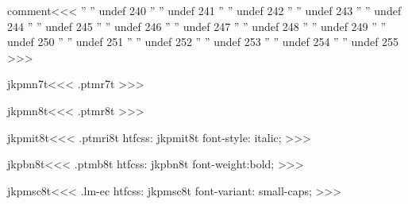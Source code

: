 \<comment\><<<
'' ''   undef    240
'' ''   undef    241
'' ''   undef    242
'' ''   undef    243
'' ''   undef    244
'' ''   undef    245
'' ''   undef    246
'' ''   undef    247
'' ''   undef    248
'' ''   undef    249
'' ''   undef    250
'' ''   undef    251
'' ''   undef    252
'' ''   undef    253
'' ''   undef    254
'' ''   undef    255           
>>>



\<jkpmn7t\><<<
.ptmr7t
>>>

\<jkpmn8t\><<<
.ptmr8t
>>>

\<jkpmit8t\><<<
.ptmri8t
htfcss:  jkpmit8t  font-style: italic;
>>>

\<jkpbn8t\><<<
.ptmb8t
htfcss:  jkpbn8t  font-weight:bold;
>>>


\<jkpmsc8t\><<<
.lm-ec
htfcss:  jkpmsc8t font-variant: small-caps;
>>>


\bye
